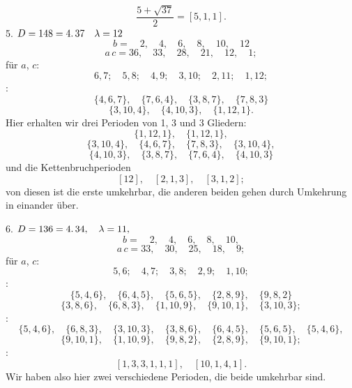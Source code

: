 \[
\frac{5 + \sqrt{37}}{2} = [5, 1, 1].
\]
5. $D = 148 = 4 \ldotp 37 \quad \lambda = 12$
\[
b = \quad 2, \quad 4, \quad 6, \quad 8, \quad 10, \quad 12
\]
\[
a\,c = 36, \quad 33, \quad 28, \quad 21, \quad 12, \quad 1;
\]
 für $a$, $c$:
\[
6, 7; \quad 5, 8; \quad 4, 9; \quad 3, 10; \quad 2, 11; \quad 1, 12;
\]
:
\[
\{4, 6, 7\}, \quad \{7, 6, 4\}, \quad \{3, 8, 7\}, \quad \{7, 8, 3\}
\]
\[
\{3, 10, 4\}, \quad \{4, 10, 3\}, \quad \{1, 12, 1\}.
\]
Hier erhalten wir drei Perioden von 1, 3 und 3 Gliedern:
\[
\{1, 12, 1\}, \quad \{1, 12, 1\},
\]
\[
\{3, 10, 4\}, \quad \{4, 6, 7\}, \quad \{7, 8, 3\}, \quad \{3, 10, 4\},
\]
\[
\{4, 10, 3\}, \quad \{3, 8, 7\}, \quad \{7, 6, 4\}, \quad \{4, 10, 3\}
\]
und die Kettenbruchperioden
\[
[12], \quad [2, 1, 3], \quad [3, 1, 2];
\]
von diesen ist die erste umkehrbar, die anderen beiden gehen
durch Umkehrung in einander über.

6. $D = 136 = 4 \ldotp 34, \quad \lambda = 11,$
\[
b = \quad 2, \quad 4, \quad 6, \quad 8, \quad 10,
\]
\[
a\,c = 33, \quad 30, \quad 25, \quad 18, \quad 9;
\]
 für $a$, $c$:
\[
5, 6; \quad 4, 7; \quad 3, 8; \quad 2, 9; \quad 1, 10;
\]
:
\[
\{5, 4, 6\}, \quad \{6, 4, 5\}, \quad \{5, 6, 5\}, \quad \{2, 8, 9\}, \quad \{9, 8, 2\}
\]
\[
\{3, 8, 6\}, \quad \{6, 8, 3\}, \quad \{1, 10, 9\}, \quad \{9, 10, 1\}, \quad \{3, 10, 3\};
\]
:
\[
\{5, 4, 6\}, \quad \{6, 8, 3\}, \quad \{3, 10, 3\}, \quad \{3, 8, 6\}, \quad \{6, 4, 5\}, \quad \{5, 6, 5\}, \quad \{5, 4, 6\},
\]
\[
\{9, 10, 1\}, \quad \{1, 10, 9\}, \quad \{9, 8, 2\}, \quad \{2, 8, 9\}, \quad \{9, 10, 1\};
\]
:
\[
[1, 3, 3, 1, 1, 1], \quad [10, 1, 4, 1].
\]
Wir haben also hier zwei verschiedene Perioden, die beide
umkehrbar sind.
